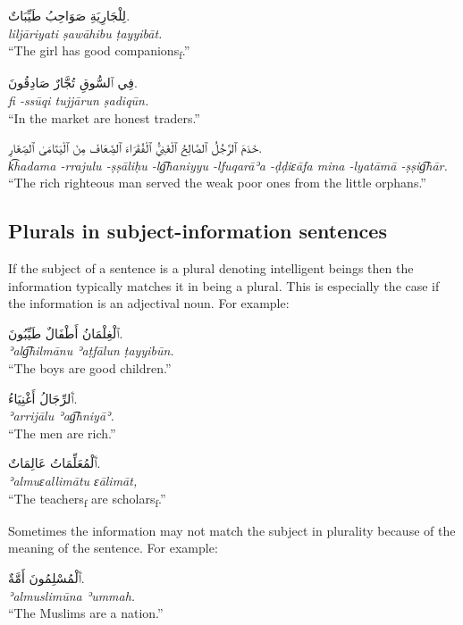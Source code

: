 \documentclass[
  10pt,
]{book}
\begin{document}
\foreignlanguage{arabic}{لِلْجَارِيَةِ صَوَاحِبُ طَيِّبَاتٌ.}\\
\emph{liljāriyati ṣawāhibu ṭayyibāt.}\\
\enquote{The girl has good companions\textsubscript{f}.}

\foreignlanguage{arabic}{فِي ٱلسُّوقِ تُجَّارٌ صَادِقُونَ.}\\
\emph{fi -ssūqi tujjārun ṣadiqūn.}\\
\enquote{In the market are honest traders.}

\foreignlanguage{arabic}{خَدَمَ ٱلرَّجُلُ ٱلصَّالِحُ ٱلْغَنِيُّ ٱلْفُقَرَاءَ ٱلضِّعَافَ مِنَ ٱلْيَتَامَىٰ ٱلصِّغَارِ.}\\
\emph{k͡hadama -rrajulu -ṣṣāliḥu -lg͡haniyyu -lfuqarāʾa -ḍḍiɛāfa mina -lyatāmā -ṣṣig͡hār.}\\
\enquote{The rich righteous man served the weak poor ones from the little orphans.}

\subsection{Plurals in subject-information sentences}\label{plurals-in-subject-information-sentences}

If the subject of a sentence is a plural denoting intelligent beings then the information typically matches it in being a plural. This is especially the case if the information is an adjectival noun. For example:

\foreignlanguage{arabic}{ٱلْغِلْمَانُ أَطْفَالٌ طَيِّبُونَ.}\\
\emph{ʾalg͡hilmānu ʾaṭfālun ṭayyibūn.}\\
\enquote{The boys are good children.}

\foreignlanguage{arabic}{ٱَلرِّجَالُ أَغْنِيَاءُ.}\\
\emph{ʾarrijālu ʾag͡hniyāʾ.}\\
\enquote{The men are rich.}

\foreignlanguage{arabic}{ٱَلْمُعَلِّمَاتُ عَالِمَاتٌ.}\\
\emph{ʾalmuɛallimātu ɛālimāt,}\\
\enquote{The teachers\textsubscript{f} are scholars\textsubscript{f}.}

Sometimes the information may not match the subject in plurality because of the meaning of the sentence. For example:

\foreignlanguage{arabic}{ٱَلْمُسْلِمُونَ أَمَّةٌ.}\\
\emph{ʾalmuslimūna ʾummah.}\\
\enquote{The Muslims are a nation.}
\end{document}
